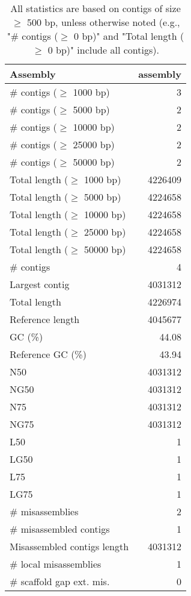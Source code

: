 \documentclass[12pt,a4paper]{article}
\begin{document}
\begin{table}[ht]
\begin{center}
\caption{All statistics are based on contigs of size $\geq$ 500 bp, unless otherwise noted (e.g., "\# contigs ($\geq$ 0 bp)" and "Total length ($\geq$ 0 bp)" include all contigs).}
\begin{tabular}{|l*{1}{|r}|}
\hline
Assembly & assembly \\ \hline
\# contigs ($\geq$ 1000 bp) & 3 \\ \hline
\# contigs ($\geq$ 5000 bp) & 2 \\ \hline
\# contigs ($\geq$ 10000 bp) & 2 \\ \hline
\# contigs ($\geq$ 25000 bp) & 2 \\ \hline
\# contigs ($\geq$ 50000 bp) & 2 \\ \hline
Total length ($\geq$ 1000 bp) & 4226409 \\ \hline
Total length ($\geq$ 5000 bp) & 4224658 \\ \hline
Total length ($\geq$ 10000 bp) & 4224658 \\ \hline
Total length ($\geq$ 25000 bp) & 4224658 \\ \hline
Total length ($\geq$ 50000 bp) & 4224658 \\ \hline
\# contigs & 4 \\ \hline
Largest contig & 4031312 \\ \hline
Total length & 4226974 \\ \hline
Reference length & 4045677 \\ \hline
GC (\%) & 44.08 \\ \hline
Reference GC (\%) & 43.94 \\ \hline
N50 & 4031312 \\ \hline
NG50 & 4031312 \\ \hline
N75 & 4031312 \\ \hline
NG75 & 4031312 \\ \hline
L50 & 1 \\ \hline
LG50 & 1 \\ \hline
L75 & 1 \\ \hline
LG75 & 1 \\ \hline
\# misassemblies & 2 \\ \hline
\# misassembled contigs & 1 \\ \hline
Misassembled contigs length & 4031312 \\ \hline
\# local misassemblies & 1 \\ \hline
\# scaffold gap ext. mis. & 0 \\ \hline

\end{tabular}
\end{center}
\end{table}
\end{document}
